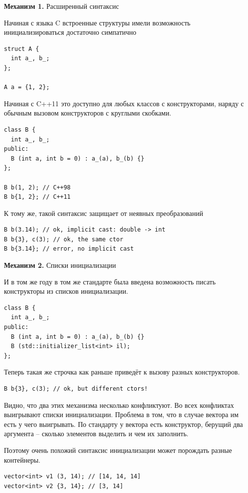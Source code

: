\documentclass[a4paper,12pt,oneside]{article}
\begin{document}
\textbf{Механизм 1.} Расширенный синтаксис

Начиная с языка C встроенные структуры имели возможность инициализироваться достаточно симпатично

\begin{lstlisting}
struct A {
  int a_, b_;
};

A a = {1, 2};
\end{lstlisting}

Начиная с C++11 это доступно для любых классов с конструкторами, наряду с обычным вызовом конструкторов с круглыми скобками.

\begin{lstlisting}
class B {
  int a_, b_;
public:  
  B (int a, int b = 0) : a_(a), b_(b) {}
};

B b(1, 2); // C++98
B b{1, 2}; // C++11
\end{lstlisting}

К тому же, такой синтаксис защищает от неявных преобразований

\begin{lstlisting}
B b(3.14); // ok, implicit cast: double -> int
B b{3}, c(3); // ok, the same ctor
B b{3.14}; // error, no implicit cast
\end{lstlisting}

\textbf{Механизм 2.} Списки инициализации

И в том же году в том же стандарте была введена возможность писать конструкторы из списков инициализации.

\begin{lstlisting}
class B {  
  int a_, b_;
public:  
  B (int a, int b = 0) : a_(a), b_(b) {}
  B (std::initializer_list<int> il);
};
\end{lstlisting}

Теперь такая же строчка как раньше приведёт к вызову разных конструкторов.

\begin{lstlisting}
B b{3}, c(3); // ok, but different ctors!
\end{lstlisting}

Видно, что два этих механизма несколько конфликтуют. Во всех конфликтах выигрывают списки инициализации. Проблема в том, что в случае вектора им есть у чего выигрывать. По стандарту у вектора есть конструктор, берущий два аргумента -- сколько элементов выделить и чем их заполнить.

Поэтому очень похожий синтаксис инициализации может порождать разные контейнеры.

\begin{lstlisting}
vector<int> v1 (3, 14); // [14, 14, 14]
vector<int> v2 {3, 14}; // [3, 14]
\end{lstlisting}
\end{document}
